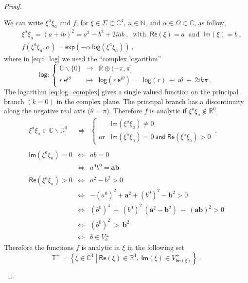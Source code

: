\documentclass[11pt]{book}
\renewcommand{\Re}{\mathsf{Re}}
\renewcommand{\Im}{\mathsf{Im}}
\renewcommand{\exp}{\mathsf{exp}}
\renewcommand{\log}{\mathsf{log}}
\newcommand{\Cbb}{\mathbb{C}}
\newcommand{\Nbb}{\mathbb{N}}
\theoremstyle{break}
\begin{document}
\begin{proof}
\begin{description}
We can write $\xi^{a}\xi_{a}$ and $f$, for $\xi \in \Sigma \subset \Cbb^4$, $n \in \Nbb$, and $\alpha \in \Omega \subset \Cbb$, as follow,
%
\begin{eqnarray}
&& \xi^{a}\xi_{a} = (a+ib)^2 = a^2 - b^2 + 2iab \ , \ \mbox{ with } \ \Re(\xi)=a \ \mbox{ and } \ \Im(\xi)=b \ , \nonumber \\[2pt]
%
&& f(\xi^a\xi_{a},\alpha) = \exp\left(-\alpha \ \log(\xi^{a}\xi_{a}) \right) \ ,
\label{eq:f_log}
\end{eqnarray}
%
where in \eqref{eq:f_log} we used the ``complex logarithm'' 
%
\begin{equation}
\mathsf{log}: \left\{
\begin{array}{rcl}
\mathbb{C} \backslash \{0\}  & \to & \mathbb{R} \oplus (-\pi,\pi] \\
r \ \mathsf{e}^{i\theta} & \mapsto & \mathsf{log}(r \ \mathsf{e}^{i\theta}) \ = \ \mathsf{log}(r) \ + \ i\theta \ + \ 2 i k \pi \ .
\end{array}\right.
\label{eq:log_complex}
\end{equation}
%
The logarithm \eqref{eq:log_complex} gives a single valued function on the principal branch $(k=0)$ in the complex plane. The principal branch has a discontinuity along the negative real axis ($\theta=\pi$). Therefore $f$ is analytic if $\xi^{a}\xi_{a} \notin \mathbb{R}^0_{-}$
%
\begin{eqnarray*}
\xi^{a}\xi_{a} \in \mathbb{C} \backslash \mathbb{R}_{-}^0 &\Longleftrightarrow&
\left\{
\begin{array}{cll}
& \Im(\xi^{a}\xi_{a}) \neq 0 \\
\text{or} & \Im(\xi^{a}\xi_{a}) = 0 \ \mathsf{and} \ \Re(\xi^{a}\xi_{a}) > 0  
\end{array}
\right. \ . \\
&& \\
\Im(\xi^{a}\xi_{a}) = 0 &\Longleftrightarrow& ab=0 \\
&\Longleftrightarrow& a^0 b^0 = \mathbf{ab} \\
&& \\
\Re(\xi^{a}\xi_{a}) > 0 &\Longleftrightarrow& a^2 - b^2 > 0 \\
&\Longleftrightarrow& -(a^0)^2 + \mathbf{a}^2 + (b^0)^2 - \mathbf{b}^2 > 0 \nonumber \\
&\Longleftrightarrow& (b^0)^4 \ + \ (b^0)^2 \ (\mathbf{a}^2-\mathbf{b}^2) \ - \ \left(\mathbf{a}\mathbf{b}\right)^2 > 0 \nonumber \\
&\Longleftrightarrow& (b^0)^2 \ > \ \mathbf{b}^2 \nonumber \\
&\Longleftrightarrow& b \in V^{\pm}_b
\end{eqnarray*}
%
Therefore the functions $f$ is analytic in $\xi$ in the following set
%
\begin{equation}
\mathbb{T}^\pm = \left. \left\{ \xi \in \mathbb{C}^4 \ \right| \ \Re(\xi)\in\mathbb{R}^4 , \ \Im(\xi)\in V^\pm_{\Im(\xi)} \right\} \ .
\label{eq:cone_analytic}
\end{equation}



\end{description}
\end{proof}
\end{document}
